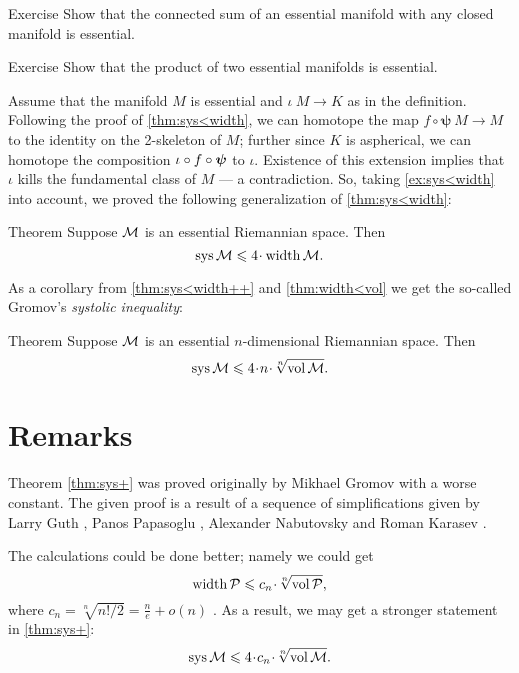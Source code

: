 \begin{thm}{Exercise}\label{ex:connected-sum-essential}
Show that the connected sum of an essential manifold with any closed manifold is essential.
\end{thm}

\begin{thm}{Exercise}\label{ex:product-essential}
Show that the product of two essential manifolds is essential.
\end{thm}

Assume that the manifold $M$ is essential and $\iota \:M\to K$ as in the definition.
Following the proof of \ref{thm:sys<width}, we can homotope the map 
$f\circ\bm{\psi}\:M\to M$ to the identity on the 2-skeleton of $M$;
further since $K$ is aspherical, we can homotope the composition
$\iota\z\circ f\circ\bm{\psi}$ to  $\iota$. 
Existence of this extension implies that $\iota$ kills the fundamental class of $M$ --- a contradiction.
So, taking \ref{ex:sys<width} into account, we proved the following generalization of \ref{thm:sys<width}:

\begin{thm}{Theorem}\label{thm:sys<width++}
Suppose $\mathcal{M}$ is an essential Riemannian space.
Then 
\[\sys\spc{M}\le 4 \cdot \width \spc{M}.\]
\end{thm}

As a corollary from \ref{thm:sys<width++} and \ref{thm:width<vol} we get the so-called  Gromov's \emph{systolic inequality}:

\begin{thm}{Theorem}\label{thm:sys+}
Suppose $\mathcal{M}$ is an essential $n$-dimensional Riemannian space.
Then 
\[\sys\spc{M}\le 4 \cdot n\cdot \sqrt[n]{\vol\spc{M}}.\]
\end{thm}


\section{Remarks}

Theorem \ref{thm:sys+} was proved originally by Mikhael Gromov \cite{gromov-1983} with a worse constant.
The given proof is a result of a sequence of simplifications given by Larry Guth \cite{guth},
Panos Papasoglu \cite{papasoglu},
Alexander Nabutovsky and Roman Karasev \cite{nabutovsky}.

The calculations could be done better; namely we could get
\[\width\spc{P}\le c_n\cdot \sqrt[n]{\vol\spc{P}},\]
where
$c_n=\sqrt[n]{n!/2}= \tfrac ne+o(n)$ \cite{nabutovsky}.
As a result, we may get a stronger statement in \ref{thm:sys+}:
\[\sys\spc{M}\le 4 \cdot c_n\cdot \sqrt[n]{\vol\spc{M}}.\]

